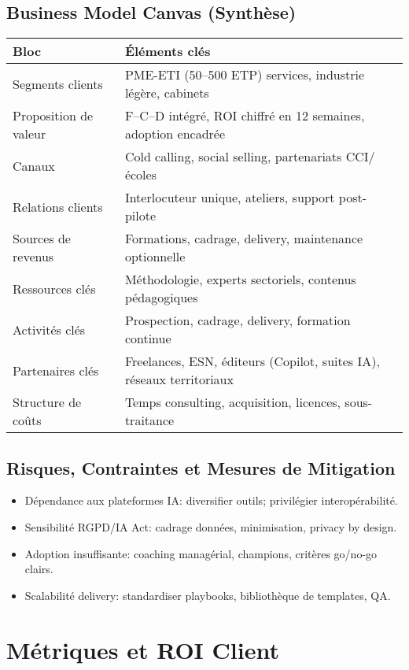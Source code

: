 \subsection{Business Model Canvas (Synthèse)}
\begin{longtable}{@{}p{4.2cm}p{10.8cm}@{}}
\toprule
\textbf{Bloc} & \textbf{Éléments clés} \\
\midrule
Segments clients & PME-ETI (50–500 ETP) services, industrie légère, cabinets \\
Proposition de valeur & F–C–D intégré, ROI chiffré en 12 semaines, adoption encadrée \\
Canaux & Cold calling, social selling, partenariats CCI/écoles \\
Relations clients & Interlocuteur unique, ateliers, support post-pilote \\
Sources de revenus & Formations, cadrage, delivery, maintenance optionnelle \\
Ressources clés & Méthodologie, experts sectoriels, contenus pédagogiques \\
Activités clés & Prospection, cadrage, delivery, formation continue \\
Partenaires clés & Freelances, ESN, éditeurs (Copilot, suites IA), réseaux territoriaux \\
Structure de coûts & Temps consulting, acquisition, licences, sous-traitance \\
\bottomrule
\end{longtable}

\subsection{Risques, Contraintes et Mesures de Mitigation}
\begin{itemize}
    \item Dépendance aux plateformes IA: diversifier outils; privilégier interopérabilité.
    \item Sensibilité RGPD/IA Act: cadrage données, minimisation, privacy by design.
    \item Adoption insuffisante: coaching managérial, champions, critères go/no-go clairs.
    \item Scalabilité delivery: standardiser playbooks, bibliothèque de templates, QA.
\end{itemize}

\section{Métriques et ROI Client}

